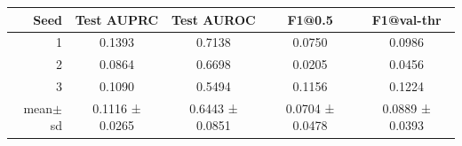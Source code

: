 \begin{tabular}{rcccc}
\toprule
Seed & Test AUPRC & Test AUROC & F1@0.5 & F1@val-thr \\
\midrule
1 & 0.1393 & 0.7138 & 0.0750 & 0.0986 \\
2 & 0.0864 & 0.6698 & 0.0205 & 0.0456 \\
3 & 0.1090 & 0.5494 & 0.1156 & 0.1224 \\
mean$\pm$sd & 0.1116 ± 0.0265 & 0.6443 ± 0.0851 & 0.0704 ± 0.0478 & 0.0889 ± 0.0393 \\
\bottomrule
\end{tabular}
